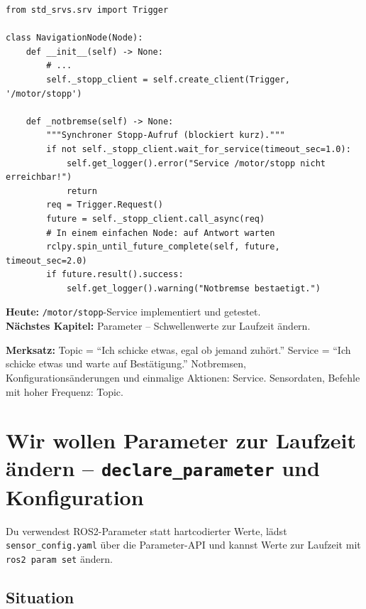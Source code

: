 \begin{lstlisting}
from std_srvs.srv import Trigger

class NavigationNode(Node):
    def __init__(self) -> None:
        # ...
        self._stopp_client = self.create_client(Trigger, '/motor/stopp')

    def _notbremse(self) -> None:
        """Synchroner Stopp-Aufruf (blockiert kurz)."""
        if not self._stopp_client.wait_for_service(timeout_sec=1.0):
            self.get_logger().error("Service /motor/stopp nicht erreichbar!")
            return
        req = Trigger.Request()
        future = self._stopp_client.call_async(req)
        # In einem einfachen Node: auf Antwort warten
        rclpy.spin_until_future_complete(self, future, timeout_sec=2.0)
        if future.result().success:
            self.get_logger().warning("Notbremse bestaetigt.")
\end{lstlisting}

\begin{projektBox}
\textbf{Heute:} \texttt{/motor/stopp}-Service implementiert und getestet.\\
\textbf{Nächstes Kapitel:} Parameter -- Schwellenwerte zur Laufzeit ändern.
\end{projektBox}

\begin{merksatzBox}
\textbf{Merksatz:}
Topic = "`Ich schicke etwas, egal ob jemand zuhört."'
Service = "`Ich schicke etwas und warte auf Bestätigung."'
Notbremsen, Konfigurationsänderungen und einmalige Aktionen:
Service. Sensordaten, Befehle mit hoher Frequenz: Topic.
\end{merksatzBox}


\chapter{Wir wollen Parameter zur Laufzeit ändern –
  \texttt{declare\_parameter} und Konfiguration}

\begin{lernziele}
Du verwendest ROS2-Parameter statt hartcodierter Werte,
lädst \texttt{sensor\_config.yaml} über die Parameter-API
und kannst Werte zur Laufzeit mit \texttt{ros2 param set} ändern.
\end{lernziele}

\section{Situation}

